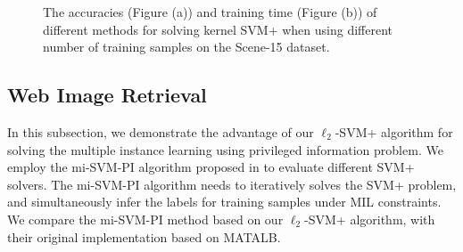 \begin{figure}
\centering
{}
\caption{The accuracies (Figure (a)) and training time (Figure (b)) of different methods for solving kernel SVM+ when using different number of training samples on the Scene-15 dataset.}
\label{svm:fig:nonlinear}
\end{figure}

\subsection{Web Image Retrieval}\label{sec:exp_nuswide}
In this subsection, we demonstrate the advantage of our $\ell_2$-SVM+
algorithm for solving the multiple instance learning using privileged
information problem. We employ the mi-SVM-PI algorithm proposed in
\citep{NiuIJCV2015} to evaluate different SVM+ solvers. The mi-SVM-PI
algorithm needs to iteratively solves the SVM+ problem, and
simultaneously infer the labels for training samples under MIL
constraints. We compare the mi-SVM-PI method based on our
$\ell_2$-SVM+ algorithm, with their original implementation based on
MATALB.

